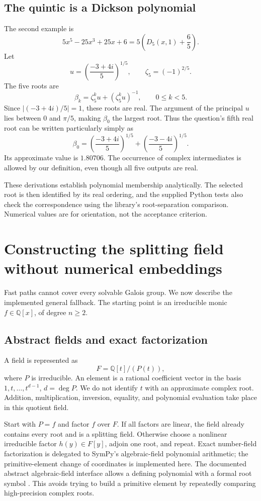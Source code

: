 \documentclass[11pt,a4paper]{article}
\theoremstyle{definition}
\theoremstyle{remark}
\newcommand{\Q}{\mathbb Q}
\newcommand{\z}{\zeta}
\begin{document}
\subsection{The quintic is a Dickson polynomial}
The second example is
\[
 5x^5-25x^3+25x+6=5\left(D_5(x,1)+\frac65\right).
\]
Let
\[
 u=\left(\frac{-3+4i}{5}\right)^{1/5},\qquad
 \z_5=(-1)^{2/5}.
\]
The five roots are
\begin{equation}\label{eq:quintic-roots}
 \beta_k=\z_5^k u+(\z_5^k u)^{-1},\qquad 0\leq k<5.
\end{equation}
Since $|(-3+4i)/5|=1$, these roots are real. The argument of the principal $u$
lies between $0$ and $\pi/5$, making $\beta_0$ the largest root. Thus the
question's fifth real root can be written particularly simply as
\begin{equation}\label{eq:beta-simple}
 \boxed{\beta_0=
 \left(\frac{-3+4i}{5}\right)^{1/5}+
 \left(\frac{-3-4i}{5}\right)^{1/5}}.
\end{equation}
Its approximate value is $1.80706$. The occurrence of complex intermediates is
allowed by our definition, even though all five outputs are real.

These derivations establish polynomial membership analytically. The selected
root is then identified by its real ordering, and the supplied Python tests
also check the correspondence using the library's root-separation comparison.
Numerical values are for orientation, not the acceptance criterion.

\section{Constructing the splitting field without numerical embeddings}
\label{sec:closure}
Fast paths cannot cover every solvable Galois group. We now describe the
implemented general fallback. The starting point is an irreducible monic
$f\in\Q[x]$, of degree $n\geq2$.

\subsection{Abstract fields and exact factorization}
A field is represented as
\[
 F=\Q[t]/(P(t)),
\]
where $P$ is irreducible. An element is a rational coefficient vector in the
basis $1,t,\ldots,t^{d-1}$, $d=\deg P$. We do not identify $t$ with an
approximate complex root. Addition, multiplication, inversion, equality, and
polynomial evaluation take place in this quotient field.

Start with $P=f$ and factor $f$ over $F$. If all factors are linear, the field
already contains every root and is a splitting field. Otherwise choose a
nonlinear irreducible factor $h(y)\in F[y]$, adjoin one root, and repeat. Exact
number-field factorization is delegated to SymPy's algebraic-field polynomial
arithmetic; the primitive-element change of coordinates is implemented here.
The documented abstract algebraic-field interface allows a defining polynomial
with a formal root symbol \cite{sympyfields}. This avoids trying to build a
primitive element by repeatedly comparing high-precision complex roots.
\end{document}
